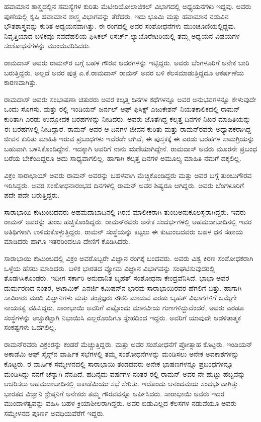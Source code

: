 ಹವಾಮಾನ ಶಾಸ್ತ್ರದಲ್ಲಿನ ಸಮಸ್ಯೆಗಳ ಕುರಿತು ಮೆಟೀರಿಯೋಲಾಜಿಕಲ್ ವಿಭಾಗದಲ್ಲಿ ಅಧ್ಯಯನಗಳು ಇದ್ದವು. ಅವರು ಪುಣೆಯಲ್ಲಿ ಕೃಷಿ ಹವಾಮಾನ ಶಾಸ್ತ್ರ ವಿಭಾಗವನ್ನು ತೆರೆದರು. ಇದು ಭೂಮಿ ಮತ್ತು ಹವಾಮಾನ ನಡುವಿನ ಭೌತಶಾಸ್ತ್ರವನ್ನು ಕುರಿತ ಅಧ್ಯಯನವಾಗಿತ್ತು. ಈ ರಂಗದಲ್ಲಿ ಅವರ ಸಂಶೋಧನೆಗಳು ಮುಂಚೂಣಿಯಲ್ಲಿದ್ದವು. ನಿವೃತ್ತಿಯಾದ ಬಳಿಕವೂ ನವದೆಹಲಿಯ ಫಿಸಿಕಲ್ ರಿಸರ್ಚ್ ಲ್ಯಾಬೊರೇಟರಿಯಲ್ಲಿ ತಮ್ಮ ಅಧ್ಯಯನ ವಿಷಯಗಳ ಸಂಶೋಧನೆಗಳನ್ನು ಮುಂದುವರಿಸಿದರು.

ರಾಮದಾಸ್ ಅವರು ರಾಮನ್‍ರ ಬಗ್ಗೆ ಬಹಳ ಗೌರವ ಆದರಗಳನ್ನು ಇಟ್ಟಿದ್ದರು. ಅವರು ಬೆಂಗಳೂರಿಗೆ ಅನೇಕ ಬಾರಿ ಬರುತ್ತಿದ್ದರು. ಅಲ್ಲದೆ ಅವರ ಪುತ್ರ ಎ.ಕೆ.ರಾಮದಾಸ್ ರಾಮನ್ ಅವರ ಬಳಿ ಕೆಲಸಮಾಡುತ್ತಿದ್ದದೂ ಆಕರ್ಷಣೆಯ ಕಾರಣವಾಗಿತ್ತು.

ರಾಮದಾಸ್ ಅವರು ಸಂಭಾಷಣಾ ಚತುರರು ಅವರ ಕಲ್ಕತ್ತ ದಿನಗಳ ಕಥೆಗಳನ್ನೂ ಅವರ ಅನುಭವಗಳನ್ನೂ ಕೇಳುವುದೇ ಒಂದು ಸೊಗಸು.  ಮತ್ತು ರಲ್ಲಿ ಇಂಡಿಯನ್ ಜರ್ನಲ್ ಆಫ್ ಫಿಸಿಕ್ಸ್ ಎಜುಕೇಶನ್ ನಿಯತಕಾಲಿಕದಲ್ಲಿ ರಾಮನ್ ಕುರಿತಾಗಿ ಎರಡು ಉದ್ಭೋದಕ ಬರಹಗಳನ್ನು ನೀಡಿದರು. ಅವರು ಜೊತೆಗಿದ್ದ ಕಲ್ಕತ್ತ ದಿನಗಳ ನಿಖರ ಮಾಹಿತಿಯನ್ನು ಈ ಬರಹಗಳಲ್ಲಿ ನೀಡಿದ್ದಾರೆ. ರಾಮನ್ ಅವರ ಆ ದಿನಗಳ ಜೀವನ ಕುರಿತು ಮತ್ತು ರಾಮನ್‍ರವರು ಅಧ್ಯಾಪಕರಾಗಿದ್ದ ಜೀವನ ಕುರಿತು ಮಾಹಿತಿ ಇರುವ ಪ್ರಬಂಧಗಳು ಇವೆರಡೇ ಆಗಿವೆ, ಈ ಪುಸ್ತಕಕ್ಕೆ ಈ ಎರಡು ಬರಹಗಳ ಸಾಮಗ್ರಿಯನ್ನು ಬಹುವಾಗಿ ಬಳಸಿಕೊಂಡಿದ್ದೇನೆ. ಇದಕ್ಕಾಗಿ ಅವರಿಗೆ ನಾನು ಋಣಿಯಾಗಿದ್ದೇನೆ. ರಾಮದಾಸ್ ಅವರು ಮೂರನೇ ಪ್ರಬಂಧ ಬರೆಯ ಬೇಕೆಂದಿದ್ದರೂ ಅದು ಸಾಧ್ಯವಾಗಲಿಲ್ಲ. ಹಾಗಾಗಿ ಕಲ್ಕತ್ತ ದಿನಗಳ ಅಮೂಲ್ಯ ಮಾಹಿತಿ ನಮಗೆ ದಕ್ಕಲಿಲ್ಲ.



ವಿಕ್ರಂ ಸಾರಾಭಾಯ್ ಅವರು ರಾಮನ್ ಅವರನ್ನು ಬಹಳವಾಗಿ ಮೆಚ್ಚಿಕೊಂಡಿದ್ದರು ಮತ್ತು ಅವರ ಬಗ್ಗೆ ತುಂಬುಗೌರವ ಇರಿಸಿದ್ದರು. ಅವರ ಸಂಶೋಧನಾರಂಭದ ದಿನಗಳಲ್ಲಿ ರಾಮನ್ ಅವರ ಶಿಷ್ಯರೂ ಆಗಿದ್ದರು. ಅವರು ಬೆಂಗಳೂರಿಗೆ ಪದೇ ಪದೇ ಬರುತ್ತಿದ್ದರು.

ಸಾರಾಭಾಯಿ ಕುಟುಂಬದವರು ಅಹಮದಾಬಾದಿನಲ್ಲಿ ಗಿರಣಿ ಮಾಲೀಕರಾಗಿ ತುಂಬ\break ಅನುಕೂಲಸ್ಥರಾಗಿದ್ದರು. ಇವರು ರಾಮನ್ ಅವರನ್ನು ತುಂಬ ಹಚ್ಚಿಕೊಂಡಿದ್ದರು. ರಾಮನ್‍ರವರು ಅನೇಕ ಸಂದರ್ಭಗಳಲ್ಲಿ ಅಹಮದಾಬಾದಿನಲ್ಲಿ ಇವರ ಅತಿಥಿಗಳಾಗಿ ಉಳಿದುಕೊಳ್ಳುತ್ತಿದ್ದರು. ರಾಮನ್ ಸಂಸ್ಥೆಯನ್ನು ಕಟ್ಟಲು ಈ ಕುಟುಂಬದವರು ಬಹಳ ಧನ ಸಹಾಯ ಮಾಡಿದರು ಹಾಗೂ ಇತರರಿಂದಲೂ ದೇಣಿಗೆ ಕೊಡಿಸಿದರು.

ಸಾರಾಭಾಯಿ ಕುಟುಂಬದಲ್ಲಿ ವಿಕ್ರಂ ಅವರೊಬ್ಬರೇ ವಿಜ್ಞಾನ ರಂಗಕ್ಕೆ ಬಂದವರು. ಅವರು ವಿಶ್ವ ಕಿರಣ ಸಂಶೋಧಕರಾಗಿ ಒಳ್ಳೆಯ ಹೆಸರು ಮಾಡಿದರು. ಬಳಿಕ ಭಾರತದ ವ್ಯೋಮ ವಿಜ್ಞಾನ ವಿಭಾಗವನ್ನು ಸಂಘಟಿಸುವುದರಲ್ಲಿ ತೊಡಗಿಸಿಕೊಂಡರು. ಇದೀಗ ಸರ್ಕಾರಿ ಅನುದಾನಿತ ಬೃಹತ್ ಸಂಶೋಧನಾ ಕೇಂದ್ರವೆನಿಸಿದೆ. ಭಾಭಾ ಅವರ ದುರ್ಮರಣದ ನಂತರ, ಅಟಾಮಿಕ್ ಎನರ್ಜಿ ಕಮಿಷನ್‍ನ ಭಾರವು ಸಾರಾಭಾಯಿರವರ ಹೆಗಲಿಗೆ ಬಿತ್ತು. ಹಾಗಾಗಿ ಸಾವಿರಾರು ಮಂದಿ ವಿಜ್ಞಾನಿಗಳು ಮತ್ತು ತಂತ್ರಜ್ಞರು ನೌಕರಿ ಮಾಡುವ ಎರಡು ಬೃಹತ್ ವಿಭಾಗಗಳಿಗೆ ಒಮ್ಮೆಗೇ ನಾಯಕತ್ವ ವಹಿಸಿದ್ದರು. ಸಾರಾಭಾಯಿ ಅವರಿಗೆ ಎಷ್ಟೊಂದು ಮಾನವೀಯ ಗುಣಗಳಿದ್ದುವೆಂದರೆ, ಅವರು ಎರಡೂ ಸಂಸ್ಥೆಗಳನ್ನು ಅಚ್ಚುಕಟ್ಟಾಗಿ ನಿಭಾಯಿಸಿ ಎಲ್ಲರೊಂದಿಗೂ ಸ್ನೇಹದಿಂದ ಇದ್ದರು. ಅವರಿಗೆ ಯಾವುದೇ ಆಡಳಿತಾತ್ಮಕ ಸಂಕಷ್ಟಗಳು ಒದಗಲಿಲ್ಲ.

ರಾಮನ್‍ರವರು ವಿಕ್ರಂರನ್ನು ಕಂಡರೆ ಮೆಚ್ಚುತ್ತಿದ್ದರು. ಮತ್ತು ಅವರ ಸಂಶೋಧನೆಗೆ ಪ್ರೋತ್ಸಾಹ ಕೊಟ್ಟರು. ಇಂಡಿಯನ್ ಅಕಾಡೆಮಿ ಆಫ್ ಸೈನ್ಸ್‌ನ ವಾರ್ಷಿಕ ಸಭೆಗಳಲ್ಲಿ ತಮ್ಮ ಸಂಶೋಧನೆಗಳನ್ನು ಮಂಡಿಸಲು ಅನೇಕ ಅವಕಾಶಗಳನ್ನು ಕೊಟ್ಟರು. ರ ವಾರ್ಷಿಕ ಸಮ್ಮೇಳನದಲ್ಲಿ ಸಾರಾಭಾಯಿ ತಂಡದವರು ಅನೇಕ ಭಾಷಣಗಳನ್ನೂ ಪ್ರಬಂಧಗಳನ್ನೂ ಮಂಡಿಸಿದ್ದು ನನಗೆ ಚೆನ್ನಾಗಿ ನೆನಪಿದೆ. ಹದಿನೈದು ವರ್ಷಗಳ ನಂತರ ರಲ್ಲಿ ರಾಮನ್ ಅವರ ನೇ ಹುಟ್ಟು ಹಬ್ಬವನ್ನು ಆಚರಿಸಲು ಅಹಮದಾಬಾದಿನಲ್ಲಿ ಅಕಾಡೆಮಿಯು ಸಭೆ ಸೇರಿತು. ಇದೊಂದು ಆನಂದಮಯ ಸಂದರ್ಭವಾಗಿತ್ತು. ಭಾರತದ ವಿಜ್ಞಾನಿ ಶ್ರೇಷ್ಠನಿಗೆ ಅನೇಕರು ತಮ್ಮ ಗೌರವವನ್ನೂ ಅರ್ಪಿಸಿದರು. ಸಾರಾಭಾಯಿ ಅವರು ಇದರ ಮುಂದಾಳತ್ವವನ್ನು ವಹಿಸಿ ಬಹಳ ಕ್ರಿಯಾಶೀಲರಾಗಿದ್ದರು. ಅವರ ಬಿಡುವಿಲ್ಲದ ಕೆಲಸಗಳ ನಡುವೆಯೂ ಅವರು ಸಮ್ಮೇಳನದ ಪೂರ್ಣ ಅವಧಿಯವೆರೆಗೆ ಇದ್ದರು.

